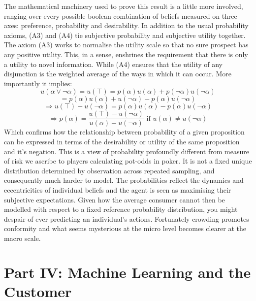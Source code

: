 \documentclass{tufte-handout}
\begin{document}
The mathematical machinery used to prove this result is a little more involved, ranging over every possible boolean combination of beliefs measured on three axes: preference, probability and desirability. In addition to the usual probability axioms, (A3) and (A4) tie subjective probability and subjective utility together. The axiom (A3) works to normalise the utility scale so that no sure prospect has any positive utility. This, in a sense, enshrines the requirement that there is only a utility to novel information. While (A4) ensures that the utility of any disjunction is the weighted average of the ways in which it can occur. More importantly it implies:
 $$u(\alpha \vee \neg\alpha) = u(\top) = p(\alpha)u(\alpha) + p(\neg\alpha)u(\neg\alpha)$$  
 $$= p(\alpha)u(\alpha) + u(\neg\alpha) - p(\alpha)u(\neg\alpha) $$
 $$ \Rightarrow u(\top) - u(\neg\alpha) = p(\alpha)u(\alpha)  - p(\alpha)u(\neg\alpha)$$
 $$ \Rightarrow p(\alpha) = \frac{u(\top) - u(\neg\alpha)}{ u(\alpha)  - u(\neg\alpha)} \text{  if } u(\alpha) \neq u(\neg\alpha) $$ 
Which confirms how the relationship between probability of a given proposition can be expressed in terms of the desirability or utility of the same proposition and it's negation. This is a view of probability profoundly different from measure of risk we ascribe to players calculating pot-odds in poker. It is not a fixed unique distribution determined by observation across repeated sampling, and consequently much harder to model. The probabilities reflect the dynamics and eccentricities of individual beliefs and the agent is seen as maximising their subjective expectations. Given how the average consumer cannot then be modelled with respect to a fixed reference probability distribution, you might despair of ever predicting an individual's actions. Fortunately crowding promotes conformity and what seems mysterious at the micro level becomes clearer at the macro scale.

\section{\textbf{Part IV: Machine Learning and the Customer}}
\end{document}
